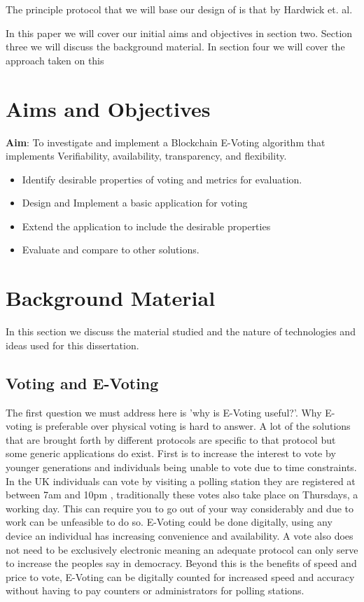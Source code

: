 \documentclass{entcs}
\begin{document}
The principle protocol that we will base our design of is that by Hardwick et. al. \cite{hardwick2018}


In this paper we will cover our initial aims and objectives in section two. Section three we will discuss the background material. In section four we will cover the approach taken on this

\section{Aims and Objectives}
\begin{center}
    {\bf Aim}: To investigate and implement a Blockchain E-Voting algorithm that implements Verifiability, availability, transparency, and flexibility. 
\end{center}
\begin{itemize}
    \item Identify desirable properties of voting and metrics for evaluation.
    \item Design and Implement a basic application for voting
    \item Extend the application to include the desirable properties
    \item Evaluate and compare to other solutions.
\end{itemize}

\section{Background Material}
In this section we discuss the material studied and the nature of technologies and ideas used for this dissertation.

\subsection{Voting and E-Voting}
The first question we must address here is 'why is E-Voting useful?'. Why E-voting is preferable over physical voting is hard to answer. A lot of the solutions that are brought forth by different protocols are specific to that protocol but some generic applications do exist. First is to increase the interest to vote by younger generations and individuals being unable to vote due to time constraints. In the UK individuals can vote by visiting a polling station they are registered at between 7am and 10pm \cite{pollStations}, traditionally these votes also take place on Thursdays, a working day. This can require you to go out of your way considerably and due to work can be unfeasible to do so. E-Voting could be done digitally, using any device an individual has increasing convenience and availability. A vote also does not need to be exclusively electronic meaning an adequate protocol can only serve to increase the peoples say in democracy. Beyond this is the benefits of speed and price to vote, E-Voting can be digitally counted for increased speed and accuracy without having to pay counters or administrators for polling stations.
\end{document}
